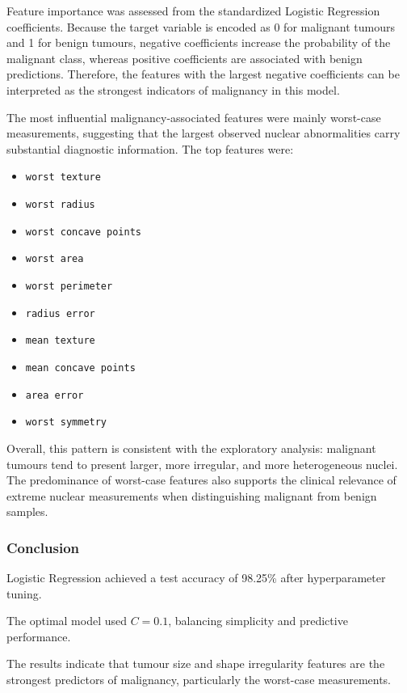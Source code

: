\documentclass[twocolumn, fontsize=10pt]{article}
\begin{document}
Feature importance was assessed from the standardized Logistic Regression coefficients. Because the target variable is encoded as 0 for malignant tumours and 1 for benign tumours, negative coefficients increase the probability of the malignant class, whereas positive coefficients are associated with benign predictions. Therefore, the features with the largest negative coefficients can be interpreted as the strongest indicators of malignancy in this model.

The most influential malignancy-associated features were mainly worst-case measurements, suggesting that the largest observed nuclear abnormalities carry substantial diagnostic information. The top features were:

\begin{itemize}[noitemsep, topsep=0pt]
    \item \texttt{worst texture}
    \item \texttt{worst radius}
    \item \texttt{worst concave points}
    \item \texttt{worst area}
    \item \texttt{worst perimeter}
    \item \texttt{radius error}
    \item \texttt{mean texture}
    \item \texttt{mean concave points}
    \item \texttt{area error}
    \item \texttt{worst symmetry}
\end{itemize}

Overall, this pattern is consistent with the exploratory analysis: malignant tumours tend to present larger, more irregular, and more heterogeneous nuclei. The predominance of worst-case features also supports the clinical relevance of extreme nuclear measurements when distinguishing malignant from benign samples.

\subsubsection{Conclusion}

Logistic Regression achieved a test accuracy of 98.25\% after hyperparameter tuning.

The optimal model used $C = 0.1$, balancing simplicity and predictive performance.

The results indicate that tumour size and shape irregularity features are the strongest predictors of malignancy, particularly the worst-case measurements.
\end{document}
